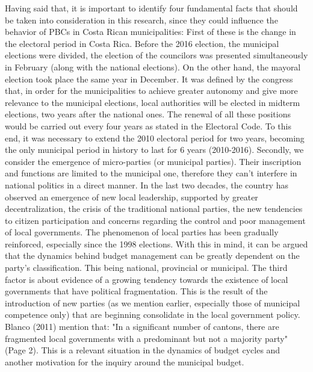 Having said that, it is important to identify four fundamental facts that should be taken into consideration in this research, since they could influence the behavior of PBCs in Costa Rican municipalities: First of these is the change in the electoral period in Costa Rica. Before the 2016 election, the municipal elections were divided, the election of the councilors was presented simultaneously in February (along with the national elections). On the other hand, the mayoral election took place the same year in December. It was defined by the congress that, in order for the municipalities to achieve greater autonomy and give more relevance to the municipal elections, local authorities will be elected in midterm elections, two years after the national ones. The renewal of all these positions would be carried out every four years as stated in the Electoral Code. \parencite[Art. 150]{al2009} To this end, it was necessary to extend the 2010 electoral period for two years, becoming the only municipal period in history to last for 6 years (2010-2016). Secondly, we consider the emergence of micro-parties (or municipal parties). Their inscription and functions are limited to the municipal one, therefore they can't interfere in national politics in a direct manner. In the last two decades, the country has observed an emergence of new local leadership, supported by greater decentralization, the crisis of the traditional national parties, the new tendencies to citizen participation and concerns regarding the control and poor management of local governments. \parencite[p. 165]{blanco2011} The phenomenon of local parties has been gradually reinforced, especially since the 1998 elections. \parencite[p. 15]{beers2006} With this in mind, it can be argued that the dynamics behind budget management can be greatly dependent on the party's classification. This being national, provincial or municipal. The third factor is about evidence of a growing tendency towards the existence of local governments that have political fragmentation. This is the result of the introduction of new parties (as we mention earlier, especially those of municipal competence only) that are beginning consolidate in the local government policy. Blanco (2011) mention that: "In a significant number of cantons, there are fragmented local governments with a predominant but not a majority party" (Page 2). This is a relevant situation in the dynamics of budget cycles and another motivation for the inquiry around the municipal budget. 

